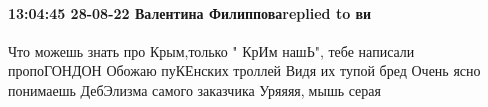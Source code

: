  
 
 
 
 

\paragraph{13:04:45 28-08-22 Валентина Филипповаreplied to ви}

Что можешь знать про Крым,только " КрИм нашЬ", тебе написали пропоГОНДОН
Обожаю пуКЕнских троллей
Видя их тупой бред
Очень ясно понимаешь
ДебЭлизма самого заказчика
Уряяяя,🐀мышь серая
